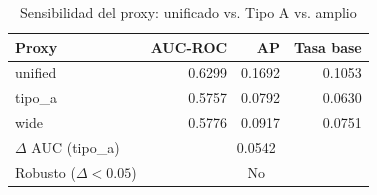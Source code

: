 \begin{table}[htbp]
\centering
\small
\caption{Sensibilidad del proxy: unificado vs. Tipo A vs. amplio}
\label{tab:sensitivity-proxy}
\begin{tabular}{lrrr}
\toprule
Proxy & AUC-ROC & AP & Tasa base \\
\midrule
  unified & 0.6299 & 0.1692 & 0.1053 \\
  tipo\_a & 0.5757 & 0.0792 & 0.0630 \\
  wide & 0.5776 & 0.0917 & 0.0751 \\
\midrule
  $\Delta$ AUC (tipo\_a) & \multicolumn{3}{c}{0.0542} \\
  Robusto ($\Delta < 0.05$) & \multicolumn{3}{c}{No} \\
\bottomrule
\end{tabular}
\end{table}
